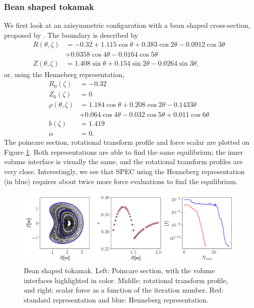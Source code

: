 \documentclass[my_thesis.tex]{subfiles}
\begin{document}
\subsubsection{Bean shaped tokamak}
We first look at an axisymmetric configuration with a bean shaped cross-section, proposed by \citet{hirshmanOptimizedFourierRepresentations1985}. The boundary is described by
\begin{align}
	R(\theta,\zeta) &= -0.32+1.115\cos\theta+0.383\cos 2\theta-0.0912\cos 3\theta\\
	&+0.0358\cos 4\theta-0.0164\cos 5\theta\\
	Z(\theta,\zeta) &= 1.408\sin\theta +0.154\sin 2\theta-0.0264\sin 3\theta,
\end{align}
or, using the Henneberg representation,
\begin{align}
	R_0(\zeta) &= -0.32\\
	Z_0(\zeta) &=  0\\
	\rho(\theta,\zeta) &= 1.184\cos\theta +0.208\cos 2\theta - 0.143 3\theta \\
	&+ 0.064\cos 4\theta-0.032\cos 5\theta +0.011\cos 6\theta\\
	b(\zeta) &= 1.419\\
	\alpha&=0.
\end{align}
The poincare section, rotational transform profile and force scalar are plotted on Figure \ref{fig. bean shape henneberg representation}. Both representations are able to find the same equilibrium; the inner volume interface is visually the same, and the rotational transform profiles are very close. Interestingly, we see that SPEC using the Henneberg representation (in blue) requires about twice more force evaluations to find the equilibrium.

\begin{figure}
	\centering
	\includegraphics[width=\linewidth]{images/HennebergRepresentation/BeanShape.png}
	\caption{Bean shaped tokamak. Left: Poincare section, with the volume interfaces highlighted in color. Middle: rotational transform profile, and right: scalar force as a function of the iteration number. Red: standard representation and blue: Henneberg representation.}
	\label{fig. bean shape henneberg representation}
\end{figure}
\end{document}
